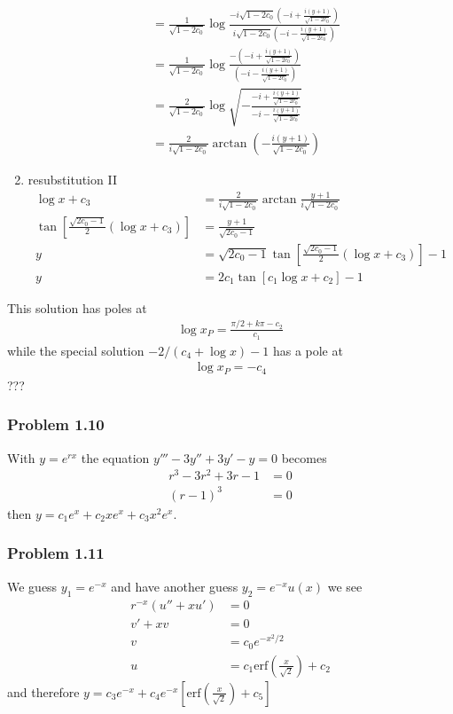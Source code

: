 \documentclass[10pt,a4paper]{book}
\theoremstyle{definition}
\begin{document}
\begin{enumerate}
\begin{align}
        &=\frac{1}{\sqrt{1-2c_0}}\log\frac{-i\sqrt{1-2c_0}\left(-i+\frac{i(y+1)}{\sqrt{1-2c_0}}\right)}{i\sqrt{1-2c_0}\left(-i-\frac{i(y+1)}{\sqrt{1-2c_0}}\right)}\\
        &=\frac{1}{\sqrt{1-2c_0}}\log\frac{-\left(-i+\frac{i(y+1)}{\sqrt{1-2c_0}}\right)}{\left(-i-\frac{i(y+1)}{\sqrt{1-2c_0}}\right)}\\
        &=\frac{2}{\sqrt{1-2c_0}}\log\sqrt{-\frac{-i+\frac{i(y+1)}{\sqrt{1-2c_0}}}{-i-\frac{i(y+1)}{\sqrt{1-2c_0}}}}\\
        &=\frac{2}{i\sqrt{1-2c_0}}\arctan\left(-\frac{i(y+1)}{\sqrt{1-2c_0}}\right)
    \end{align}
    \item resubstitution II
    \begin{align}
        \log x+c_3&=\frac{2}{i\sqrt{1-2c_0}}\arctan \frac{y+1}{i\sqrt{1-2c_0}}\\
        \tan\left[\frac{\sqrt{2c_0-1}}{2}(\log x+c_3)\right]&=\frac{y+1}{\sqrt{2c_0-1}}\\
        y&=\sqrt{2c_0-1}\tan\left[\frac{\sqrt{2c_0-1}}{2}(\log x+c_3)\right]-1\\
        y&=2c_1\tan\left[c_1\log x+c_2\right]-1
    \end{align}

\end{enumerate}
This solution has poles at
\begin{align}
    \log x_P =\frac{\pi/2+k\pi-c_2}{c_1}
\end{align}
while the special solution $-2/(c_4+\log x)-1$ has a pole at
\begin{align}
    \log x_P=-c_4
\end{align}
???

\subsubsection{Problem 1.10}
With $y=e^{rx}$ the equation $y'''-3y''+3y'-y=0$ becomes
\begin{align}
    r^3-3r^2+3r-1&=0\\
    (r-1)^3&=0
\end{align}
then $y=c_1e^x+c_2xe^x+c_3x^2e^x$.

\subsubsection{Problem 1.11}
We guess $y_1=e^{-x}$ and have another guess  $y_2=e^{-x}u(x)$ we see
\begin{align}
    r^{-x}\left(u''+xu'\right)&=0\\
    v'+xv&=0\\
    v&=c_0e^{-x^2/2}\\
    u&=c_1\text{erf}\left(\frac{x}{\sqrt{2}}\right)+c_2
\end{align}
and therefore $y=c_3e^{-x}+c_4e^{-x}\left[\text{erf}\left(\frac{x}{\sqrt{2}}\right)+c_5\right]$
\end{document}
